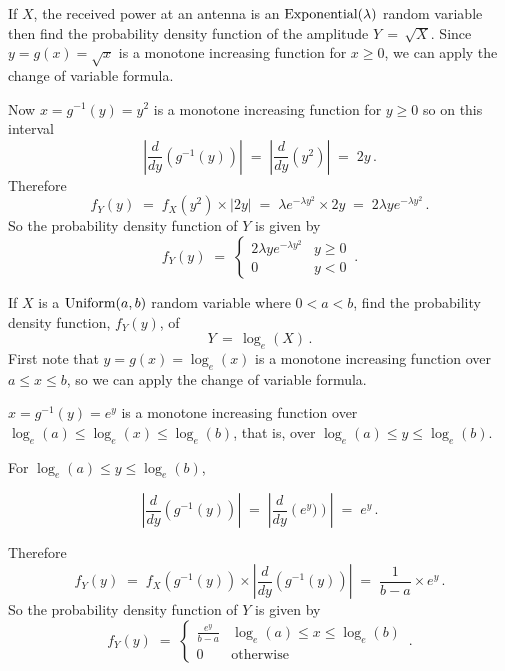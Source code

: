 \begin{ExerciseList}
\ee

\Exercise
If $X$, the received power at an antenna is an $\mbox{{\rm Exponential}}(\lambda)$ random variable then find the probability density function of the amplitude $Y\,=\, \sqrt X$.
\Answer
Since $y=g(x) = \sqrt{x}$ is a monotone increasing function for $x \geqslant 0$,  we can apply the change of variable formula.

Now $x= g^{-1}(y) = y^2$ is a monotone increasing function for $y\geqslant 0$ so on this interval
\[
\left|  \frac{d}{dy}\left(g^{-1}(y)\right)\right|\;=\; \left|  \frac{d}{dy}\left( y^2\right)\right|\;=\; 2y\,.\]
Therefore
\[
f_Y(y) 
\;=\; f_X\left(  y^2\right) \times  \left| 2y \right|
\;=\;  \lambda e ^{-\lambda y^2} \times  2y  \;=\;   2 \lambda y e ^{-\lambda y^2}\,.
\]
So the  probability density function  of $Y$ is given by
\[
f_Y(y)\;=\;\begin{cases} \displaystyle  2 \lambda y e ^{-\lambda y^2}   &    y\geqslant 0 \\ 0 & y <0
\end{cases} \,.
\]


\Exercise
If $X$ is a $\mbox{{\rm Uniform}}(a,b)$ random variable where $0 < a < b$, find  the probability density function, $f_Y (y)$, of \[ Y\,=\, \log_e(X) \, .\]
\Answer
First note that $y=g(x) = \log_e(x)$ is a monotone increasing function over  $a \leqslant x \leqslant b$, so we can apply the change of variable formula.

 $x= g^{-1}(y) = e^y$ is a monotone increasing function over $\log_e(a) \leqslant   \log_e(x) \leqslant \log_e(b)$, that is, over $\log_e(a) \leqslant   y \leqslant   \log_e(b)$.

For $\log_e(a) \leqslant   y \leqslant   \log_e(b)$,

\[\left|  \frac{d}{dy}\left(g^{-1}(y)\right)\right|\;=\; \left|  \frac{d}{dy}\left(e^y)\right)\right|\;=\; e^y\,.\]

Therefore 
\[
  f_Y(y) \;=\; f_X\left(g^{-1}(y)\right) \times  \left|  \frac{d}{dy} \left(g^{-1}(y)\right)\right|\;=\; \frac{1}{b-a} \times e^y\,.
\]
So the  probability density
  function  of $Y$ is given by  
\[f_Y(y)\;=\;\begin{cases} \displaystyle  \frac{e^y}{b-a}  &   \log_e(a)\leqslant x \leqslant \log_e(b)\\ 0 &
  \text{otherwise}
\end{cases} \,.
\]



\end{ExerciseList}
